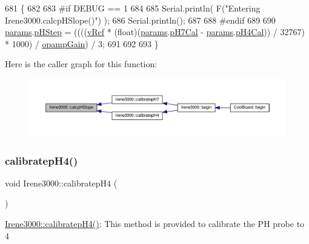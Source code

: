 \begin{DoxyCode}
681 \{
682 
683 \textcolor{preprocessor}{#if DEBUG == 1 }
684 
685     Serial.println( F(\textcolor{stringliteral}{"Entering Irene3000.calcpHSlope()"}) );
686     Serial.println();
687 
688 \textcolor{preprocessor}{#endif }
689 
690     \hyperlink{class_irene3000_a136585a5ee7f9ac6ab52175fa153f8e3}{params}.\hyperlink{struct_irene3000_1_1parameters___t_a61cfcc2539d5f630e9071f3753aba9fe}{pHStep} = ((((\hyperlink{class_irene3000_a018e7ff9bee57e6d2b298667a668ba7e}{vRef} * (float)(\hyperlink{class_irene3000_a136585a5ee7f9ac6ab52175fa153f8e3}{params}.\hyperlink{struct_irene3000_1_1parameters___t_a21265466a570d84bff914f26d2f7a03e}{pH7Cal} - 
      \hyperlink{class_irene3000_a136585a5ee7f9ac6ab52175fa153f8e3}{params}.\hyperlink{struct_irene3000_1_1parameters___t_a1144de6fb54eb3e1dd2a3d8c2afc97dc}{pH4Cal})) / 32767) * 1000) / \hyperlink{class_irene3000_a4e588985ca74e5076029d5dee81034f2}{opampGain}) / 3;
691 
692  
693 \}
\end{DoxyCode}
Here is the caller graph for this function\+:\nopagebreak
\begin{figure}[H]
\begin{center}
\leavevmode
\includegraphics[width=350pt]{d6/d03/class_irene3000_a81f6a79e546679692053f7ac1af49613_icgraph}
\end{center}
\end{figure}
\mbox{\label{class_irene3000_aa140dd026922a04981edfd04d46cabbe}} 
\subsubsection{\texorpdfstring{calibratep\+H4()}{calibratepH4()}}
{\footnotesize\ttfamily void Irene3000\+::calibratep\+H4 (\begin{DoxyParamCaption}{ }\end{DoxyParamCaption})}

\hyperlink{class_irene3000_aa140dd026922a04981edfd04d46cabbe}{Irene3000\+::calibratep\+H4()}\+: This method is provided to calibrate the PH probe to 4 

